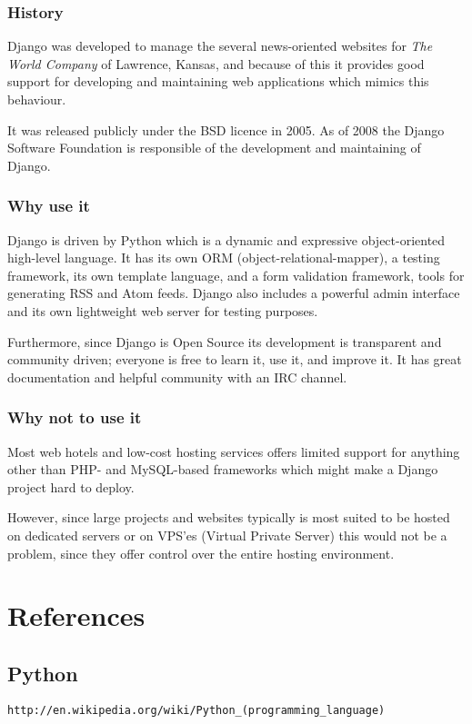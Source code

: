 \documentclass[a4paper,10pt]{article}
\begin{document}
\subsubsection{History}
Django was developed to manage the several news-oriented websites for \textit{The World Company} of Lawrence, Kansas, and because of this it provides good support for developing and maintaining web applications which mimics this behaviour.

It was released publicly under the BSD licence in 2005. As of 2008 the Django Software Foundation is responsible of the development and maintaining of Django.

\subsubsection{Why use it}
Django is driven by Python which is a dynamic and expressive object-oriented high-level language. It has its own ORM (object-relational-mapper), a testing framework, its own template language, and a form validation framework, tools for generating RSS and Atom feeds. Django also includes a powerful admin interface and its own lightweight web server for testing purposes.

Furthermore, since Django is Open Source its development is transparent and community driven; everyone is free to learn it, use it, and improve it. It has great documentation and helpful community with an IRC channel.

\subsubsection{Why not to use it}
Most web hotels and low-cost hosting services offers limited support for anything other than PHP- and MySQL-based frameworks which might make a Django project hard to deploy. 

However, since large projects and websites typically is most suited to be hosted on dedicated servers or on VPS'es (Virtual Private Server) this would not be a problem, since they offer control over the entire hosting environment.

\appendix
\section{References}
\subsection{Python}
\begin{verbatim}
http://en.wikipedia.org/wiki/Python_(programming_language)
\end{verbatim}
\end{document}
